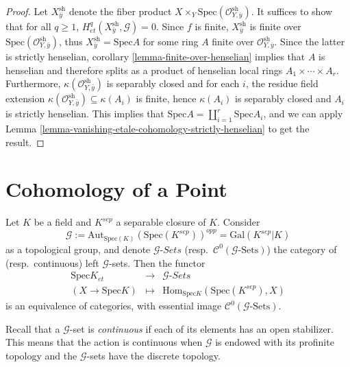 \begin{proof}
Let $X_{\bar y}^\text{sh}$ denote the fiber product $X\times_Y
\text{Spec}(\mathcal{O}_{Y, \bar y}^\text{sh})$. It suffices to show that for
all $q\geq 1$, $H_{et}^q(X_{\bar y}^\text{sh}, \mathcal{G})=0$. Since $f$ is
finite, $X_{\bar y}^\text{sh}$ is finite over $\text{Spec}(\mathcal{O}_{Y, \bar
y}^\text{sh})$, thus $X_{\bar y}^\text{sh} = \text{Spec} A$ for some ring $A$
finite over $\mathcal{O}_{Y, \bar y}^\text{sh}$. Since the latter is strictly
henselian, corollary \ref{lemma-finite-over-henselian} implies that $A$
is henselian and therefore splits as a product of henselian local rings $A_1
\times \cdots \times A_r$. Furthermore, $\kappa(\mathcal{O}_{Y, \bar
y}^\text{sh})$ is separably closed and for each $i$, the residue field
extension $\kappa(\mathcal{O}_{Y, \bar y}^\text{sh}) \subseteq \kappa(A_i)$ is
finite, hence $\kappa(A_i)$ is separably closed and $A_i$ is strictly
henselian. This implies that $\text{Spec} A = \coprod_{i=1}^r \text{Spec} A_i$,
and we can apply
Lemma \ref{lemma-vanishing-etale-cohomology-strictly-henselian} to get
the result.
\end{proof}





\section{Cohomology of a Point}
\label{section-cohomology-point}

\begin{lemma}
\label{lemma-sheaves-point}
Let $K$ be a field and $K^{sep}$ a separable closure of $K$. Consider
$$
\mathcal{G} := \text{Aut}_{\text{Spec}(K)}(\text{Spec}(K^{sep}))^{opp} =
\text{Gal}(K^{sep} | K)
$$
as a topological group, and denote $\mathcal{G}\textit{-Sets}$
(resp.\ $\mathcal{C}^0(\mathcal{G}\text{-Sets})$)
the category of (resp.\ continuous) left $\mathcal{G}$-sets.
Then the functor
$$
\begin{matrix}
\text{Spec} K _{et} & \longrightarrow & \mathcal{G}\textit{-Sets} \\
(X\to\text{Spec} K) & \longmapsto & \text{Hom}_{\text{Spec}
K}\left(\text{Spec}(K^{sep}), X\right)
\end{matrix}
$$
is an equivalence of categories, with essential image
$\mathcal{C}^0(\mathcal{G}\text{-Sets})$.
\end{lemma}

\noindent
Recall that a $\mathcal{G}$-set is {\it continuous} if each of its elements
has an open stabilizer. This means that the action is continuous when
$\mathcal{G}$ is endowed with its profinite topology and the $\mathcal{G}$-sets
have the discrete topology.

